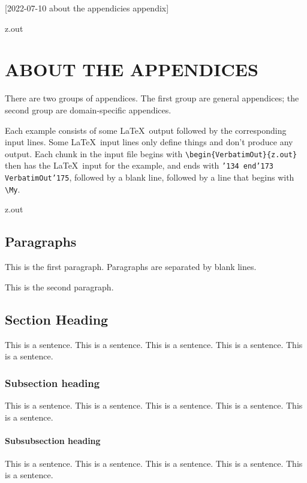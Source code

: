 [2022-07-10 about the appendicies appendix]

\begin{VerbatimOut}{z.out}
\chapter{ABOUT THE APPENDICES}

There are two groups of appendices.
The first group are general appendices;
the second group are domain-specific appendices.

Each example consists of some \LaTeX\ output
followed by the corresponding input lines.
Some \LaTeX\ input lines only define things
and don't produce any output.
Each chunk in the input file begins with
\verb+\begin{VerbatimOut}{z.out}+
then has the \LaTeX\ input for the example,
and ends with {\tt \char'134 end\char'173 VerbatimOut\char'175},
followed by a blank line,
followed by a line that begins with
\verb+\My+.

\end{VerbatimOut}

\MyIO


\begin{VerbatimOut}{z.out}


\section{Paragraphs}

This is the first paragraph.
Paragraphs are separated by blank lines.

This is the second paragraph.


\section{Section Heading}

This is a sentence.
This is a sentence.
This is a sentence.
This is a sentence.
This is a sentence.


\subsection{Subsection heading}

This is a sentence.
This is a sentence.
This is a sentence.
This is a sentence.
This is a sentence.


\subsubsection{Subsubsection heading}

This is a sentence.
This is a sentence.
This is a sentence.
This is a sentence.
This is a sentence.
\end{VerbatimOut}

